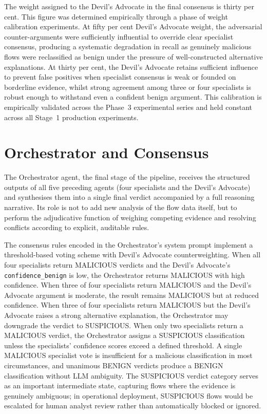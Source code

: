 \documentclass[../main.tex]{subfiles}
\begin{document}
The weight assigned to the Devil's Advocate in the final consensus is thirty per cent. This figure was determined empirically through a phase of weight calibration experiments. At fifty per cent Devil's Advocate weight, the adversarial counter-arguments were sufficiently influential to override clear specialist consensus, producing a systematic degradation in recall as genuinely malicious flows were reclassified as benign under the pressure of well-constructed alternative explanations. At thirty per cent, the Devil's Advocate retains sufficient influence to prevent false positives when specialist consensus is weak or founded on borderline evidence, whilst strong agreement among three or four specialists is robust enough to withstand even a confident benign argument. This calibration is empirically validated across the Phase~3 experimental series and held constant across all Stage~1 production experiments.

\section{Orchestrator and Consensus}
\label{sec:orchestrator-consensus}

The Orchestrator agent, the final stage of the pipeline, receives the structured outputs of all five preceding agents (four specialists and the Devil's Advocate) and synthesises them into a single final verdict accompanied by a full reasoning narrative. Its role is not to add new analysis of the flow data itself, but to perform the adjudicative function of weighing competing evidence and resolving conflicts according to explicit, auditable rules.

The consensus rules encoded in the Orchestrator's system prompt implement a threshold-based voting scheme with Devil's Advocate counterweighting. When all four specialists return MALICIOUS verdicts and the Devil's Advocate's \texttt{confidence\_benign} is low, the Orchestrator returns MALICIOUS with high confidence. When three of four specialists return MALICIOUS and the Devil's Advocate argument is moderate, the result remains MALICIOUS but at reduced confidence. When three of four specialists return MALICIOUS but the Devil's Advocate raises a strong alternative explanation, the Orchestrator may downgrade the verdict to SUSPICIOUS. When only two specialists return a MALICIOUS verdict, the Orchestrator assigns a SUSPICIOUS classification unless the specialists' confidence scores exceed a defined threshold. A single MALICIOUS specialist vote is insufficient for a malicious classification in most circumstances, and unanimous BENIGN verdicts produce a BENIGN classification without LLM ambiguity. The SUSPICIOUS verdict category serves as an important intermediate state, capturing flows where the evidence is genuinely ambiguous; in operational deployment, SUSPICIOUS flows would be escalated for human analyst review rather than automatically blocked or ignored.
\end{document}
